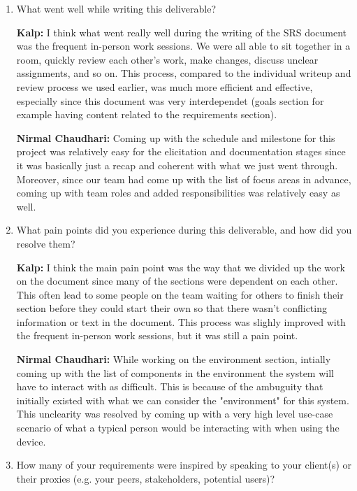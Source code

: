 \begin{enumerate}
  \item What went well while writing this deliverable? 

  \textbf{Kalp:} I think what went really well during the writing of the SRS
  document was the frequent in-person work sessions. We were all able to sit 
  together in a room, quickly review each other's work, make changes, discuss 
  unclear assignments, and so on. This process, compared to the individual 
  writeup and review process we used earlier, was much more efficient and 
  effective, especially since this document was very interdependet (goals
  section for example having content related to the requirements section).
  
  \textbf{Nirmal Chaudhari:} Coming up with the schedule and milestone for this
  project was relatively easy for the elicitation and documentation stages 
  since it was basically just a recap and coherent with what we just went 
  through. Moreover, since our team had come up with the list of focus areas 
  in advance, coming up with team roles and added responsibilities was 
  relatively easy as well. 

  \item What pain points did you experience during this deliverable, and how did
  you resolve them?

  \textbf{Kalp:} I think the main pain point was the way that we divided up the 
  work on the document since many of the sections were dependent on each other.
  This often lead to some people on the team waiting for others to finish their
  section before they could start their own so that there wasn't conflicting
  information or text in the document. This process was slighly improved with 
  the frequent in-person work sessions, but it was still a pain point.
  
  \textbf{Nirmal Chaudhari:} While working on the environment section, intially 
  coming up with the list of components in the environment the system will 
  have to interact with as difficult. This is because of the ambuguity that 
  initially existed with what we can consider the "environment" for this system.
  This unclearity was resolved by coming up with a very high level use-case 
  scenario of what a typical person would be interacting with when using the 
  device. 

  \item How many of your requirements were inspired by speaking to your
  client(s) or their proxies (e.g. your peers, stakeholders, potential users)?


\end{enumerate}
